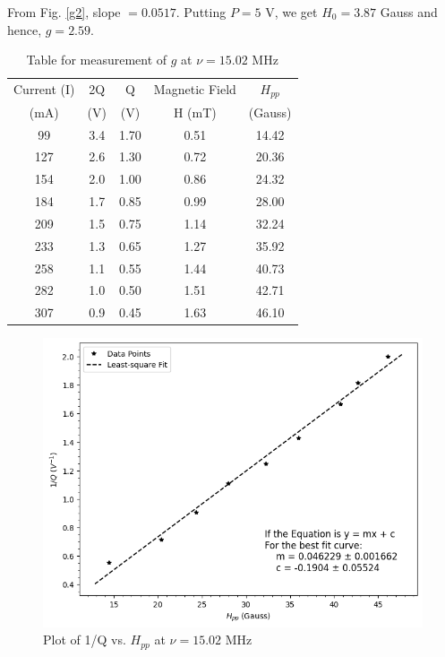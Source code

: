 From Fig. \ref{g2}, slope $= 0.0517$. Putting $P=5$ V, we get $H_0=3.87$ Gauss and hence, $g=2.59$.

\begin{table}[H]
    \centering
        \caption{Table for measurement of $g$ at $\nu= 15.02$ MHz}
        \begin{tabular}{|c|c|c|c|c|} \hline
        Current (I) & 2Q & Q & Magnetic Field & $H_{pp}$ \\ 
        (mA) & (V) & (V) & H (mT) & (Gauss)\\ \hline
        99 & 3.4 & 1.70  & 0.51 & 14.42 \\
        127 & 2.6 & 1.30  & 0.72 & 20.36 \\
        154 & 2.0   & 1.00    & 0.86 & 24.32 \\
        184 & 1.7 & 0.85 & 0.99 & 28.00   \\
        209 & 1.5 & 0.75 & 1.14 & 32.24 \\
        233 & 1.3 & 0.65 & 1.27 & 35.92 \\
        258 & 1.1 & 0.55 & 1.44 & 40.73 \\
        282 & 1.0  & 0.50 & 1.51 & 42.71 \\
        307 & 0.9 & 0.45 & 1.63 & 46.10  \\ \hline
    \end{tabular}    
    \label{tab:3}
\end{table}

\begin{figure}[H]
    \centering
    \includegraphics[width=1\columnwidth]{images/3.png}
    \caption{Plot of 1/Q vs. $H_{pp}$ at $\nu=15.02$ MHz}
    \label{g3}
\end{figure}

